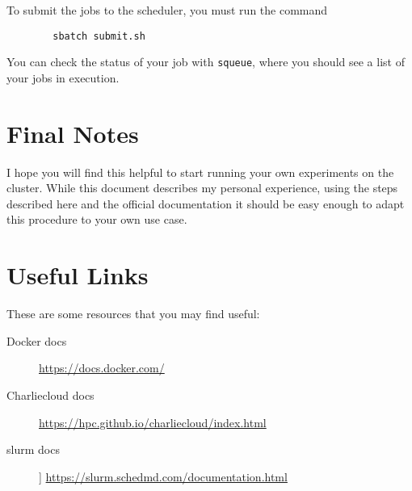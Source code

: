 \documentclass{article}
\begin{document}
    To submit the jobs to the scheduler, you must run the command
    \begin{verbatim}
        sbatch submit.sh
    \end{verbatim}

    You can check the status of your job with \verb!squeue!, where you should see a list of your jobs in execution.

    \section{Final Notes}
    I hope you will find this helpful to start running your own experiments on the cluster. While this document describes my personal experience, using the steps described here and the official documentation it should be easy enough to adapt this procedure to your own use case.

    \section{Useful Links}
    These are some resources that you may find useful:
    \begin{description}
        \item[Docker docs] \url{https://docs.docker.com/}
        \item[Charliecloud docs] \url{https://hpc.github.io/charliecloud/index.html}
        \item[slurm docs]] \url{https://slurm.schedmd.com/documentation.html} 
    \end{description}
\end{document}
